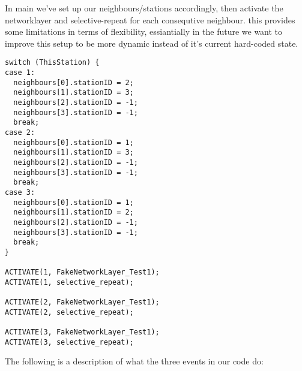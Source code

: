 In main we've set up our neighbours/stations accordingly, then activate the networklayer and selective-repeat for each consequtive neighbour.
this provides some limitations in terms of flexibility,
essiantially in the future we want to improve this setup to be more dynamic instead of it's current hard-coded state.
\begin{lstlisting}
switch (ThisStation) {
case 1:
  neighbours[0].stationID = 2;
  neighbours[1].stationID = 3;
  neighbours[2].stationID = -1;
  neighbours[3].stationID = -1;
  break;
case 2:
  neighbours[0].stationID = 1;
  neighbours[1].stationID = 3;
  neighbours[2].stationID = -1;
  neighbours[3].stationID = -1;
  break;
case 3:
  neighbours[0].stationID = 1;
  neighbours[1].stationID = 2;
  neighbours[2].stationID = -1;
  neighbours[3].stationID = -1;
  break;
}

ACTIVATE(1, FakeNetworkLayer_Test1);
ACTIVATE(1, selective_repeat);

ACTIVATE(2, FakeNetworkLayer_Test1);
ACTIVATE(2, selective_repeat);

ACTIVATE(3, FakeNetworkLayer_Test1);
ACTIVATE(3, selective_repeat);
\end{lstlisting}



The following is a description of what the three events in our code do:
\\

%
%

